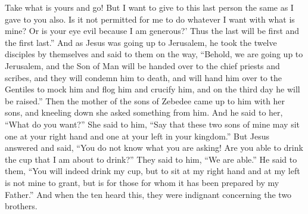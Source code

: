\begin{biblechapter}
\verse Take what is yours and go! But I want to give to this last person the same as I gave to you also.
\verse Is it not permitted for me to do whatever I want with what is mine? Or is your eye evil because I am generous?’
\verse Thus the last will be first and the first last.”
 And as Jesus was going up to Jerusalem, he took the twelve disciples by themselves and said to them on the way,
\verse “Behold, we are going up to Jerusalem, and the Son of Man will be handed over to the chief priests and scribes, and they will condemn him to death,
\verse and will hand him over to the Gentiles to mock him and flog him and crucify him, and on the third day he will be raised.”
 Then the mother of the sons of Zebedee came up to him with her sons, and kneeling down she asked something from him.
\verse And he said to her, “What do you want?” She said to him, “Say that these two sons of mine may sit one at your right hand and one at your left in your kingdom.”
\verse But Jesus answered and said, “You do not know what you are asking! Are you able to drink the cup that I am about to drink?” They said to him, “We are able.”
\verse He said to them, “You will indeed drink my cup, but to sit at my right hand and at my left is not mine to grant, but is for those for whom it has been prepared by my Father.”
\verse And when the ten heard this, they were indignant concerning the two brothers.

\end{biblechapter}

